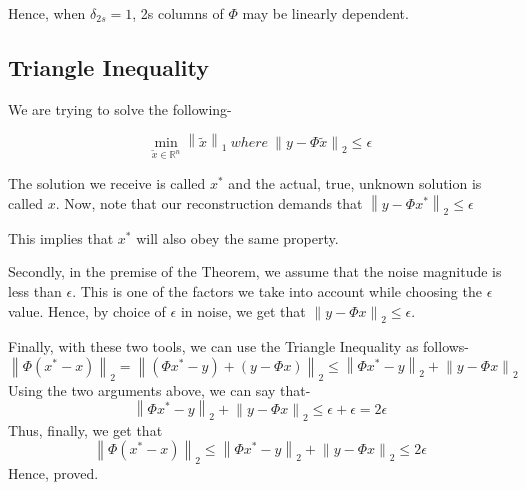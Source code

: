 \documentclass[a4paper,11pt]{article}
\numberwithin{definition}{section}
\numberwithin{mytheorem}{subsection}
\newcommand\norm[1]{\left\lVert#1\right\rVert}
\begin{document}
Hence, when $\delta_{2s}=1$, 2s columns of $\Phi$ may be linearly dependent.

\subsection{Triangle Inequality}

We are trying to solve the following-

$$ \min_{\tilde{x} \in \mathbb{R}^n} \norm{\tilde{x}}_1 ~where ~\norm{y - \Phi \tilde{x}}_2 \leq \epsilon $$

The solution we receive is called $x^*$ and the actual, true, unknown solution is called $x$. Now, note that our reconstruction demands that  $\norm{y - \Phi x^*}_2 \leq \epsilon$

This implies that $x^*$ will also obey the same property.

Secondly, in the premise of the Theorem, we assume that the noise magnitude is less than $\epsilon$. This is one of the factors we take into account while choosing the $\epsilon$ value. Hence, by choice of $\epsilon$ in noise, we get that
$\norm{y - \Phi x}_2 \leq \epsilon$.

Finally, with these two tools, we can use the Triangle Inequality as follows-
$$\norm{\Phi(x^* - x)}_2 = \norm{(\Phi x^* - y) + (y - \Phi x)}_2 \leq \norm{\Phi x^* - y}_2 + \norm{y-\Phi x}_2$$
Using the two arguments above, we can say that-
$$\norm{\Phi x^* - y}_2 + \norm{y-\Phi x}_2 \leq \epsilon + \epsilon = 2\epsilon$$
Thus, finally, we get that 
$$\norm{\Phi(x^* - x)}_2 \leq \norm{\Phi x^* - y}_2 + \norm{y-\Phi x}_2 \leq 2\epsilon$$
Hence, proved.
\end{document}
